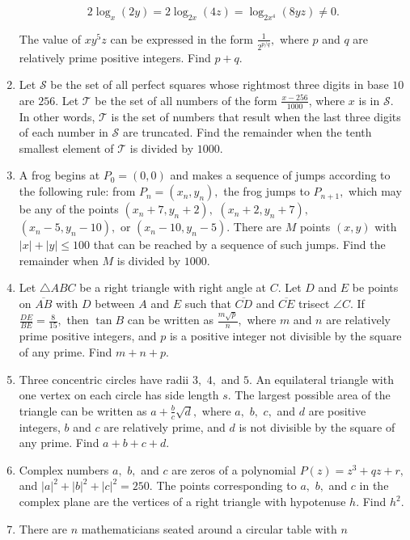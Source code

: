 \documentclass{article}
\begin{document}
\begin{enumerate}[label=\arabic*., itemsep=0.5em]
\begin{equation*}
2\log_{x}(2y) = 2\log_{2x}(4z) = \log_{2x^4}(8yz) \ne 0.
\end{equation*}

The value of $xy^5z$ can be expressed in the form $\frac{1}{2^{p/q}},$ where $p$ and $q$ are relatively prime positive integers. Find $p+q.$\par \vspace{0.5em}\item Let $\mathcal{S}$ be the set of all perfect squares whose rightmost three digits in base $10$ are $256$. Let $\mathcal{T}$ be the set of all numbers of the form $\frac{x-256}{1000}$, where $x$ is in $\mathcal{S}$. In other words, $\mathcal{T}$ is the set of numbers that result when the last three digits of each number in $\mathcal{S}$ are truncated. Find the remainder when the tenth smallest element of $\mathcal{T}$ is divided by $1000$.\par \vspace{0.5em}\item A frog begins at $P_0 = (0,0)$ and makes a sequence of jumps according to the following rule: from $P_n = (x_n, y_n),$ the frog jumps to $P_{n+1},$ which may be any of the points $(x_n + 7, y_n + 2),$ $(x_n + 2, y_n + 7),$ $(x_n - 5, y_n - 10),$ or $(x_n - 10, y_n - 5).$ There are $M$ points $(x, y)$ with $|x| + |y| \le 100$ that can be reached by a sequence of such jumps. Find the remainder when $M$ is divided by $1000.$\par \vspace{0.5em}\item Let $\triangle ABC$ be a right triangle with right angle at $C.$ Let $D$ and $E$ be points on $\overline{AB}$ with $D$ between $A$ and $E$ such that $\overline{CD}$ and $\overline{CE}$ trisect $\angle C.$ If $\frac{DE}{BE} = \frac{8}{15},$ then $\tan B$ can be written as $\frac{m \sqrt{p}}{n},$ where $m$ and $n$ are relatively prime positive integers, and $p$ is a positive integer not divisible by the square of any prime. Find $m+n+p.$\par \vspace{0.5em}\item Three concentric circles have radii $3,$ $4,$ and $5.$ An equilateral triangle with one vertex on each circle has side length $s.$ The largest possible area of the triangle can be written as $a + \tfrac{b}{c} \sqrt{d},$ where $a,$ $b,$ $c,$ and $d$ are positive integers, $b$ and $c$ are relatively prime, and $d$ is not divisible by the square of any prime. Find $a+b+c+d.$\par \vspace{0.5em}\item Complex numbers $a,$ $b,$ and $c$ are zeros of a polynomial $P(z) = z^3 + qz + r,$ and $|a|^2 + |b|^2 + |c|^2 = 250.$ The points corresponding to $a,$ $b,$ and $c$ in the complex plane are the vertices of a right triangle with hypotenuse $h.$ Find $h^2.$\par \vspace{0.5em}\item There are $n$ mathematicians seated around a circular table with $n$ 
\end{enumerate}
\end{document}
